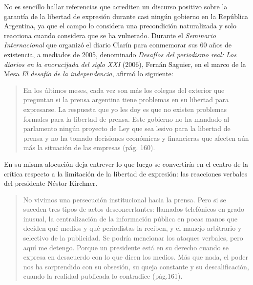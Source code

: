 No es sencillo hallar referencias que acrediten un discurso positivo sobre la garantía de la libertad de expresión durante casi ningún gobierno en la República Argentina, ya que el campo lo considera una precondición naturalizada y solo reacciona cuando considera que se ha vulnerado. Durante el \emph{Seminario Internacional} que organizó el diario Clarín para conmemorar sus 60 años de existencia, a mediados de 2005, denominado \emph{Desafíos del periodismo real: Los diarios en la encrucijada del siglo XXI} (2006), Fernán Saguier, en el marco de la Mesa \emph{El desafío de la independencia}, afirmó lo siguiente:

\begin{quote}
En los últimos meses, cada vez son más los colegas del exterior que preguntan si la prensa argentina tiene problemas en su libertad para expresarse. La respuesta que yo les doy es que no existen problemas formales para la libertad de prensa. Este gobierno no ha mandado al parlamento ningún proyecto de Ley que sea lesivo para la libertad de prensa y no ha tomado decisiones económicas y financieras que afecten aún más la situación de las empresas (pág. 160).
\end{quote}

En su misma alocución deja entrever lo que luego se convertiría en el centro de la crítica respecto a la limitación de la libertad de expresión: las reacciones verbales del presidente Néstor Kirchner.

\begin{quote}
No vivimos una persecución institucional hacia la prensa. Pero si se suceden tres tipos de actos desconcertantes: llamados telefónicos en grado inusual, la centralización de la información pública en pocas manos que deciden qué medios y qué periodistas la reciben, y el manejo arbitrario y selectivo de la publicidad. Se podría mencionar los ataques verbales, pero aquí me detengo. Porque un presidente está en su derecho cuando se expresa en desacuerdo con lo que dicen los medios. Más que nada, el poder nos ha sorprendido con su obsesión, su queja constante y su descalificación, cuando la realidad publicada lo contradice (pág.161).
\end{quote}

